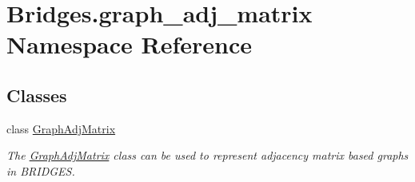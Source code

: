 \hypertarget{namespace_bridges_1_1graph__adj__matrix}{}\section{Bridges.\+graph\+\_\+adj\+\_\+matrix Namespace Reference}
\label{namespace_bridges_1_1graph__adj__matrix}
\subsection*{Classes}
\begin{DoxyCompactItemize}
\item 
class \mbox{\hyperlink{class_bridges_1_1graph__adj__matrix_1_1_graph_adj_matrix}{Graph\+Adj\+Matrix}}
\begin{DoxyCompactList}\small\item\em The \mbox{\hyperlink{class_bridges_1_1graph__adj__matrix_1_1_graph_adj_matrix}{Graph\+Adj\+Matrix}} class can be used to represent adjacency matrix based graphs in B\+R\+I\+D\+G\+ES. \end{DoxyCompactList}\end{DoxyCompactItemize}
